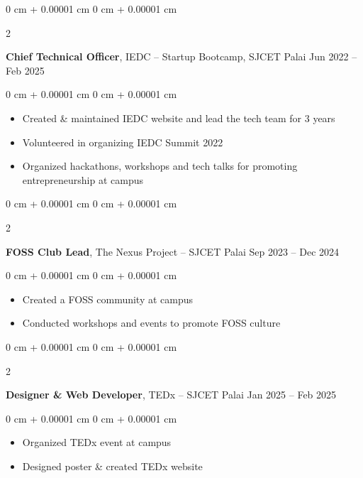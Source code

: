 \documentclass[10pt, letterpaper]{article}
\newenvironment{highlights}{
    \begin{itemize}[
        topsep=0.10 cm,
        parsep=0.10 cm,
        partopsep=0pt,
        itemsep=0pt,
        leftmargin=0 cm + 10pt
    ]
}{
    \end{itemize}
} %
\newenvironment{onecolentry}{
    \begin{adjustwidth}{
        0 cm + 0.00001 cm
    }{
        0 cm + 0.00001 cm
    }
}{
    \end{adjustwidth}
} %
\newenvironment{twocolentry}[2][]{
    \onecolentry
    \def\secondColumn{#2}
    \setcolumnwidth{\fill, 4.5 cm}
    \begin{paracol}{2}
}{
    \switchcolumn \raggedleft \secondColumn
    \end{paracol}
    \endonecolentry
} %
\begin{document}
\vspace{0.2 cm}

\begin{twocolentry}{
		Jun 2022 – Feb 2025
	}
	\textbf{Chief Technical Officer}, IEDC -- Startup Bootcamp, SJCET Palai\end{twocolentry}

\vspace{0.10 cm}
\begin{onecolentry}
	\begin{highlights}
		\item Created \& maintained IEDC website and lead the tech team for 3 years
		\item Volunteered in organizing IEDC Summit 2022
		\item Organized hackathons, workshops and tech talks for promoting entrepreneurship at campus
	\end{highlights}
\end{onecolentry}

\vspace{0.2 cm}

\begin{twocolentry}{
		Sep 2023 – Dec 2024
	}
	\textbf{FOSS Club Lead}, The Nexus Project -- SJCET Palai\end{twocolentry}

\vspace{0.10 cm}
\begin{onecolentry}
	\begin{highlights}
		\item Created a FOSS community at campus
		\item Conducted workshops and events to promote FOSS culture
	\end{highlights}
\end{onecolentry}

\vspace{0.2 cm}

\begin{twocolentry}{
		Jan 2025 – Feb 2025
	}
	\textbf{Designer \& Web Developer}, TEDx -- SJCET Palai\end{twocolentry}

\vspace{0.10 cm}
\begin{onecolentry}
	\begin{highlights}
		\item Organized TEDx event at campus
		\item Designed poster \& created TEDx website
	\end{highlights}
\end{onecolentry}
\end{document}
